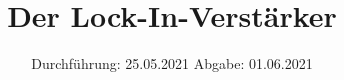 

\subject{V303}
\title{Der Lock-In-Verstärker}
\date{%
  Durchführung: 25.05.2021
  \hspace{3em}
  Abgabe: 01.06.2021
}



\maketitle
\thispagestyle{empty}
\tableofcontents
\newpage







\printbibliography{}


